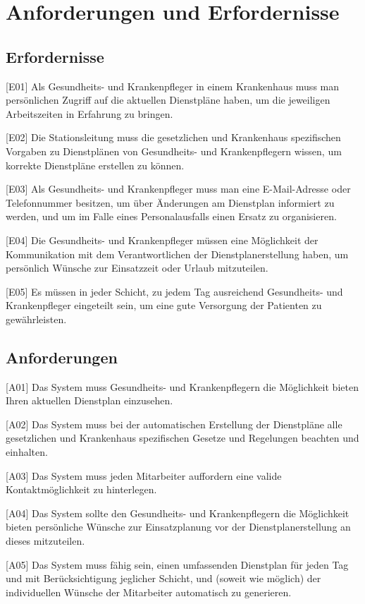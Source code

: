 \documentclass[10pt,a4paper]{article}
\begin{document}
\section{Anforderungen und Erfordernisse}
\subsection{Erfordernisse}

  [E01] Als Gesundheits- und Krankenpfleger in einem Krankenhaus muss man persönlichen Zugriff auf die aktuellen Dienstpläne haben, um die jeweiligen Arbeitszeiten in Erfahrung zu bringen.

[E02] Die Stationsleitung muss die gesetzlichen und Krankenhaus spezifischen Vorgaben zu Dienstplänen von Gesundheits- und Krankenpflegern wissen, um korrekte Dienstpläne erstellen zu können.

[E03] Als Gesundheits- und Krankenpfleger muss man eine E-Mail-Adresse oder Telefonnummer besitzen, um über Änderungen am Dienstplan informiert zu werden, und um im Falle eines Personalausfalls einen Ersatz zu organisieren.

[E04] Die Gesundheits- und Krankenpfleger müssen eine Möglichkeit der Kommunikation mit dem Verantwortlichen der Dienstplanerstellung haben, um persönlich Wünsche zur Einsatzzeit oder Urlaub mitzuteilen.

[E05] Es müssen in jeder Schicht, zu jedem Tag ausreichend Gesundheits- und Krankenpfleger eingeteilt sein, um eine gute Versorgung der Patienten zu gewährleisten.
\subsection{Anforderungen}

  [A01] Das System muss Gesundheits- und Krankenpflegern die Möglichkeit bieten Ihren aktuellen Dienstplan einzusehen.

[A02] Das System muss bei der automatischen Erstellung der Dienstpläne alle gesetzlichen und Krankenhaus spezifischen Gesetze und Regelungen beachten und einhalten.

[A03] Das System muss jeden Mitarbeiter auffordern eine valide Kontaktmöglichkeit zu hinterlegen.

[A04] Das System sollte den Gesundheits- und Krankenpflegern die Möglichkeit bieten persönliche Wünsche zur Einsatzplanung vor der Dienstplanerstellung an dieses mitzuteilen.

[A05] Das System muss fähig sein, einen umfassenden Dienstplan für jeden Tag und mit Berücksichtigung jeglicher Schicht, und (soweit wie möglich) der individuellen Wünsche der Mitarbeiter automatisch zu generieren.
\end{document}
